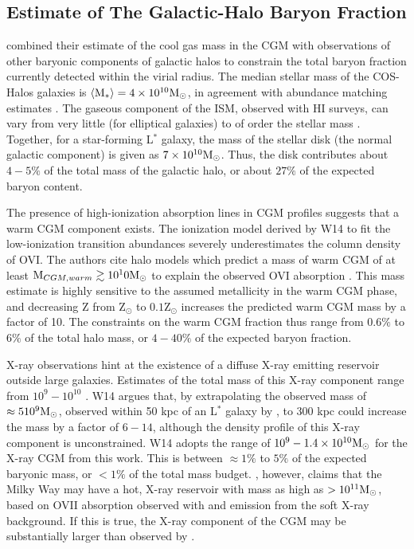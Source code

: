 \subsection{Estimate of The Galactic-Halo Baryon Fraction}
\label{sec:Galaxy.Fraction}

\citet{Werk2014} combined their estimate of the cool gas mass in the
CGM with observations of other baryonic components of galactic halos
to constrain the total baryon fraction currently detected within the
virial radius. The median stellar mass of the COS-Halos galaxies is
$\left<\textrm{M}{}_*\right> = 4\times 10^{10}\textrm{M}_\odot$, in agreement with
abundance matching estimates \citep{Behroozi2010}. The gaseous
component of the ISM, observed with HI surveys, can vary from very
little (for elliptical galaxies) to of order the stellar mass
\citep{McGaugh2010, Martin2010}. Together, for a star-forming L$^*$
galaxy, the mass of the stellar disk (the normal galactic component)
is given as $7\times 10^{10}\textrm{M}_\odot{}$. Thus, the disk contributes about $4-5\%$
of the total mass of the galactic halo, or about $27\%$ of the
expected baryon content. 

The presence of high-ionization absorption lines in CGM profiles
suggests that a warm CGM component exists. The ionization model
derived by W14 to fit the low-ionization transition
abundances severely underestimates the column density of OVI. The
authors cite halo models which predict a mass of warm CGM of at least
$\textrm{M}_{CGM, warm} \gtrsim 10^10\textrm{M}_\odot{}$ to explain the observed OVI
absorption \citep{Peeples2014}. This mass estimate is highly sensitive
to the assumed metallicity in the warm CGM phase, and decreasing Z
from Z$_\odot$ to $0.1$Z$_\odot$ increases the predicted warm CGM mass
by a factor of 10. The constraints on the warm CGM fraction thus range
from $0.6\%$ to $6\%$ of the total halo mass, or $4-40\%$ of the
expected baryon fraction. 

X-ray observations hint at the existence of a diffuse X-ray emitting
reservoir outside large galaxies. Estimates of the total mass of this
X-ray component range from $10^9 - 10^{10}$ \Msun{}. W14 argues that,
by extrapolating the observed mass of $\approx 510^9\textrm{M}_\odot{}$, observed
within 50 kpc of an L$^*$ galaxy by \Rosat{} \citep{Anderson2013}, to
300 kpc could increase the mass by a factor of $6-14$, although the
density profile of this X-ray component is unconstrained. W14 adopts
the range of $10^9 - 1.4\times 10^{10}\textrm{M}_\odot{}$ for the X-ray CGM from this
work. This is between $\approx 1\%$ to $5\%$ of the expected baryonic
mass, or $<1\%$ of the total mass budget. \citet{Gupta2012}, however,
claims that the Milky Way may have a hot, X-ray reservoir with mass as
high as $>10^{11}\textrm{M}_\odot{}$, based on OVII absorption observed with
\XMM{} and emission from the soft X-ray background. If this is true,
the X-ray component of the CGM may be substantially larger than
observed by \citet{Anderson2013}. 

